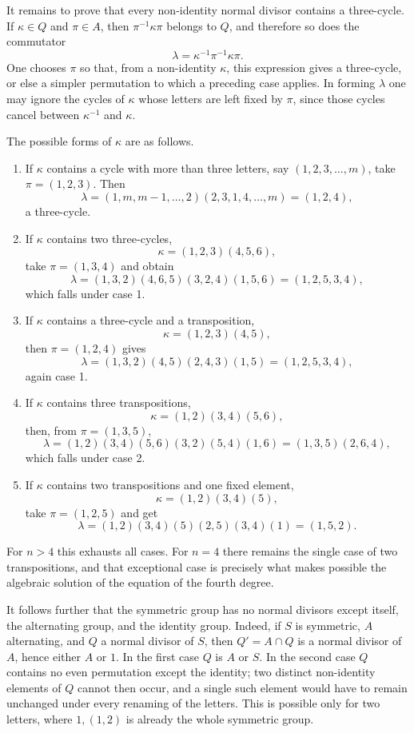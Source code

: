 \documentclass[11pt]{article}
\begin{document}
It remains to prove that every non-identity normal divisor contains a three-cycle. If $\kappa\in Q$ and $\pi\in A$, then $\pi^{-1}\kappa\pi$ belongs to $Q$, and therefore so does the commutator
\[
  \lambda=\kappa^{-1}\pi^{-1}\kappa\pi .                       \tag{1}
\]
One chooses $\pi$ so that, from a non-identity $\kappa$, this expression gives a three-cycle, or else a simpler permutation to which a preceding case applies. In forming $\lambda$ one may ignore the cycles of $\kappa$ whose letters are left fixed by $\pi$, since those cycles cancel between $\kappa^{-1}$ and $\kappa$.

The possible forms of $\kappa$ are as follows.
\begin{enumerate}[label=\arabic*.]
\item If $\kappa$ contains a cycle with more than three letters, say $(1,2,3,\ldots,m)$, take $\pi=(1,2,3)$. Then
\[
\lambda=(1,m,m-1,\ldots,2)(2,3,1,4,\ldots,m)=(1,2,4),
\]
a three-cycle.
\item If $\kappa$ contains two three-cycles,
\[
  \kappa=(1,2,3)(4,5,6),
\]
take $\pi=(1,3,4)$ and obtain
\[
\lambda=(1,3,2)(4,6,5)(3,2,4)(1,5,6)=(1,2,5,3,4),
\]
which falls under case 1.
\item If $\kappa$ contains a three-cycle and a transposition,
\[
  \kappa=(1,2,3)(4,5),
\]
then $\pi=(1,2,4)$ gives
\[
\lambda=(1,3,2)(4,5)(2,4,3)(1,5)=(1,2,5,3,4),
\]
again case 1.
\item If $\kappa$ contains three transpositions,
\[
  \kappa=(1,2)(3,4)(5,6),
\]
then, from $\pi=(1,3,5)$,
\[
\lambda=(1,2)(3,4)(5,6)(3,2)(5,4)(1,6)=(1,3,5)(2,6,4),
\]
which falls under case 2.
\item If $\kappa$ contains two transpositions and one fixed element,
\[
  \kappa=(1,2)(3,4)(5),
\]
take $\pi=(1,2,5)$ and get
\[
\lambda=(1,2)(3,4)(5)(2,5)(3,4)(1)=(1,5,2).
\]
\end{enumerate}
For $n>4$ this exhausts all cases. For $n=4$ there remains the single case of two transpositions, and that exceptional case is precisely what makes possible the algebraic solution of the equation of the fourth degree.

It follows further that the symmetric group has no normal divisors except itself, the alternating group, and the identity group. Indeed, if $S$ is symmetric, $A$ alternating, and $Q$ a normal divisor of $S$, then $Q'=A\cap Q$ is a normal divisor of $A$, hence either $A$ or $1$. In the first case $Q$ is $A$ or $S$. In the second case $Q$ contains no even permutation except the identity; two distinct non-identity elements of $Q$ cannot then occur, and a single such element would have to remain unchanged under every renaming of the letters. This is possible only for two letters, where $1,(1,2)$ is already the whole symmetric group.
\end{document}
